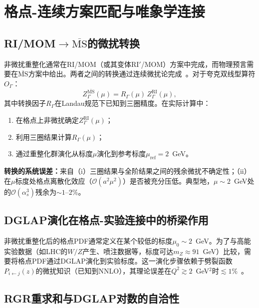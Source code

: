 \documentclass[12pt,a4paper]{ctexart}
\theoremstyle{definition}
\begin{document}
\section{格点-连续方案匹配与唯象学连接}

\subsection{RI/MOM$\to\overline{\text{MS}}$的微扰转换}

非微扰重整化通常在RI/MOM（或其变体RI$'$/MOM）方案中完成，而物理预言需要在$\overline{\text{MS}}$方案中给出。两者之间的转换通过连续微扰论完成~\cite{GattringerLang2010}。对于夸克双线型算符$O_\Gamma$：
\begin{equation}
Z_\Gamma^{\overline{\text{MS}}}(\mu) = R_\Gamma(\mu) \, Z_\Gamma^{\text{RI}}(\mu),
\label{eq:RI_to_MS_conversion}
\end{equation}
其中转换因子$R_\Gamma$在Landau规范下已知到三圈精度。在实际计算中：
\begin{enumerate}[nosep]
    \item 在格点上非微扰确定$Z_\Gamma^{\text{RI}}(\mu)$；
    \item 利用三圈结果计算$R_\Gamma(\mu)$；
    \item 通过重整化群演化从标度$\mu$演化到参考标度$\mu_{\text{ref}} = 2$~GeV。
\end{enumerate}

\textbf{转换的系统误差：}来自（i）三圈结果与全阶结果之间的残余微扰不确定性；（ii）在$\mu$标度处格点离散化效应（$\mathcal{O}(a^2\mu^2)$）是否被充分压低。典型地，$\mu \sim 2$~GeV处的$\mathcal{O}(\alpha_s^3)$残余为$\sim 1\text{--}2\%$。

\subsection{DGLAP演化在格点-实验连接中的桥梁作用}

非微扰重整化后的格点PDF通常定义在某个较低的标度$\mu_0 \sim 2$~GeV。为了与高能实验数据（如LHC的$W/Z$产生、喷注数据等，标度可达$m_Z \approx 91$~GeV）比较，需要将格点PDF通过DGLAP演化到实验标度。这一演化步骤依赖于劈裂函数$P_{i\leftarrow j}(z)$的微扰知识（已知到NNLO），其理论误差在$Q^2 \gtrsim 2$~GeV$^2$时$\lesssim 1\%$~\cite{NNPDF2021}。

\subsection{RGR重求和与DGLAP对数的自洽性}
\end{document}
